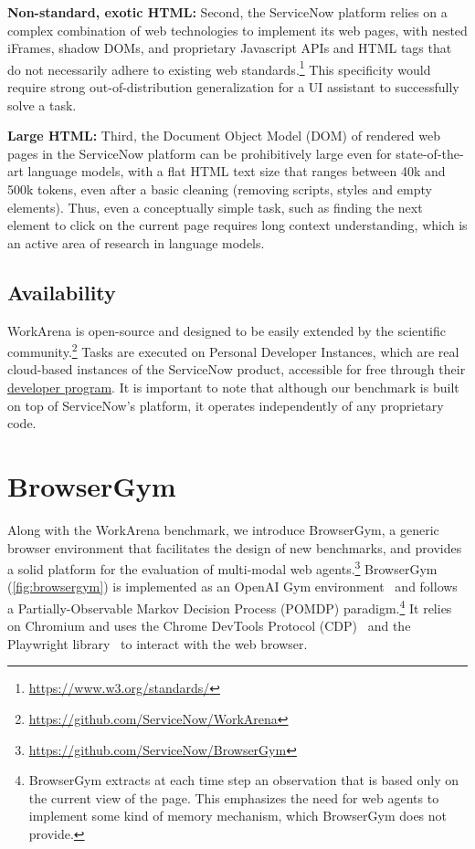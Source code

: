 \documentclass{article}
\theoremstyle{plain}
\theoremstyle{definition}
\theoremstyle{remark}
\begin{document}
\textbf{Non-standard, exotic HTML:} Second, the ServiceNow platform relies on a complex combination of web technologies to implement its web pages, with nested iFrames, shadow DOMs, and proprietary Javascript APIs and HTML tags that do not necessarily adhere to existing web standards.\footnote{\url{https://www.w3.org/standards/}} This specificity would require strong out-of-distribution generalization for a UI assistant to successfully solve a task.

\textbf{Large HTML:} Third, the Document Object Model (DOM) of rendered web pages in the ServiceNow platform can be prohibitively large even for state-of-the-art language models, with a flat HTML text size that ranges between 40k and 500k tokens, even after a basic cleaning (removing scripts, styles and empty elements). Thus, even a conceptually simple task, such as finding the next element to click on the current page requires long context understanding, which is an active area of research in language models.


\subsection{Availability}

WorkArena is open-source and designed to be easily extended by the scientific community.\footnote{\url{https://github.com/ServiceNow/WorkArena}}
Tasks are executed on Personal Developer Instances, which are real cloud-based instances of the ServiceNow product, accessible for free through their \href{https://developer.servicenow.com}{developer program}.
It is important to note that although our benchmark is built on top of ServiceNow’s platform, it operates independently of any proprietary code.


\section{BrowserGym}\label{sec:browsergym}

Along with the WorkArena benchmark, we introduce BrowserGym, a generic browser environment that facilitates the design of new benchmarks, and provides a solid platform for the evaluation of multi-modal web agents.\footnote{\url{https://github.com/ServiceNow/BrowserGym}} BrowserGym (\cref{fig:browsergym}) is implemented as an OpenAI Gym environment~\citep{software/gym} and follows a Partially-Observable Markov Decision Process (POMDP) paradigm.\footnote{BrowserGym extracts at each time step an observation that is based only on the current view of the page. This emphasizes the need for web agents to implement some kind of memory mechanism, which BrowserGym does not provide.} It relies on Chromium and uses the Chrome DevTools Protocol (CDP)~\citep{software/chromedevtools} and the Playwright library~\citep{Playwright} to interact with the web browser.
\end{document}

